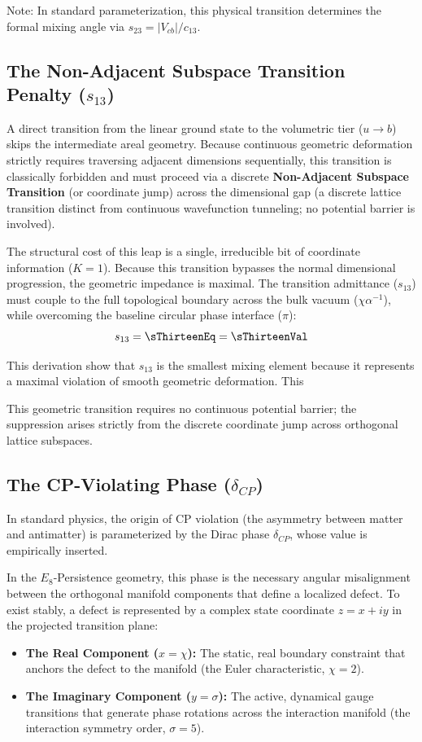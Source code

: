 Note: In standard parameterization, this physical transition determines the formal mixing angle via $s_{23} = |V_{cb}| / c_{13}$.


\subsection{The Non-Adjacent Subspace Transition Penalty (\texorpdfstring{$s_{13}$}{s13})}
A direct transition from the linear ground state to the volumetric tier ($u \to b$) skips the intermediate areal geometry. Because continuous geometric deformation strictly requires traversing adjacent dimensions sequentially, this transition is classically forbidden and must proceed via a discrete \textbf{Non-Adjacent Subspace Transition} (or coordinate jump) across the dimensional gap (a discrete lattice transition distinct from continuous wavefunction tunneling; no potential barrier is involved).

The structural cost of this leap is a single, irreducible bit of coordinate information ($K = 1$). Because this transition bypasses the normal dimensional progression, the geometric impedance is maximal. The transition admittance ($s_{13}$) must couple to the full topological boundary across the bulk vacuum ($\chi\alpha^{-1}$), while overcoming the baseline circular phase interface ($\pi$):
\begin{equation}
    s_{13} = \sThirteenEq = \sThirteenVal
\end{equation}

This derivation show that $s_{13}$ is the smallest mixing element because it represents a maximal violation of smooth geometric deformation. This \sThirteenAccText

This geometric transition requires no continuous potential barrier; the suppression arises strictly from the discrete coordinate jump across orthogonal lattice subspaces.

\subsection{The CP-Violating Phase (\texorpdfstring{$\delta_{CP}$}{delta CP})}

In standard physics, the origin of CP violation (the asymmetry between matter and antimatter) is parameterized by the Dirac phase $\delta_{CP}$, whose value is empirically inserted.

In the $E_8$-Persistence geometry, this phase is the necessary angular misalignment between the orthogonal manifold components that define a localized defect. To exist stably, a defect is represented by a complex state coordinate $z = x + iy$ in the projected transition plane:
\begin{itemize}
    \item \textbf{The Real Component ($x = \chi$):} The static, real boundary constraint that anchors the defect to the manifold (the Euler characteristic, $\chi = 2$).
    \item \textbf{The Imaginary Component ($y = \sigma$):} The active, dynamical gauge transitions that generate phase rotations across the interaction manifold (the interaction symmetry order, $\sigma = 5$).
\end{itemize}

